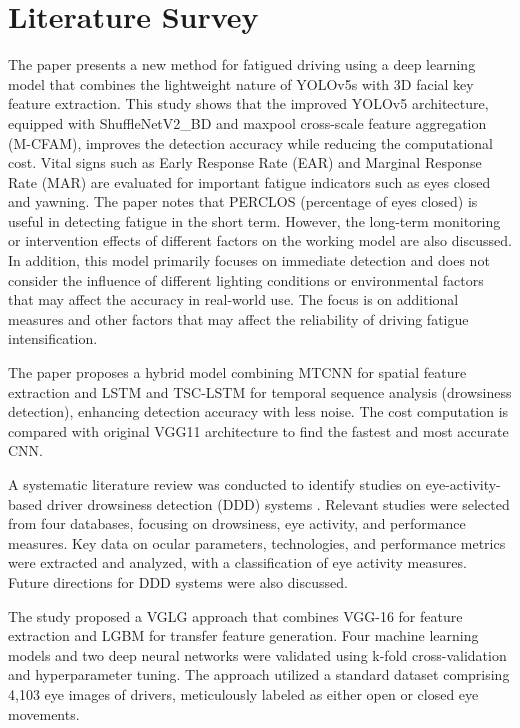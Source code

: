 \chapter{Literature Survey}

The paper \cite{ran2023} presents a new method for fatigued driving using a deep learning model that combines the lightweight nature of YOLOv5s with 3D facial key feature extraction. This study shows that the improved YOLOv5 architecture, equipped with ShuffleNetV2\_BD and maxpool cross-scale feature aggregation (M-CFAM), improves the detection accuracy while reducing the computational cost. Vital signs such as Early Response Rate (EAR) and Marginal Response Rate (MAR) are evaluated for important fatigue indicators such as eyes closed and yawning.
The paper notes that PERCLOS (percentage of eyes closed) is useful in detecting fatigue in the short term. However, the long-term monitoring or intervention effects of different factors on the working model are also discussed.
In addition, this model primarily focuses on immediate detection and does not consider the influence of different lighting conditions or environmental factors that may affect the accuracy in real-world use. The focus is on additional measures and other factors that may affect the reliability of driving fatigue intensification.

The paper \cite{guo2019} proposes a hybrid model combining MTCNN for spatial feature extraction and LSTM and TSC-LSTM for temporal sequence analysis (drowsiness detection), enhancing detection accuracy with less noise. The cost computation is compared with original VGG11 architecture to find the fastest and most accurate CNN.

A systematic literature review was conducted to identify studies on eye-activity-based driver drowsiness detection (DDD) systems \cite{kolus2024}. Relevant studies were selected from four databases, focusing on drowsiness, eye activity, and performance measures. Key data on ocular parameters, technologies, and performance metrics were extracted and analyzed, with a classification of eye activity measures. Future directions for DDD systems were also discussed.

The study \cite{madni2024} proposed a VGLG approach that combines VGG-16 for feature extraction and LGBM for transfer feature generation. Four machine learning models and two deep neural networks were validated using k-fold cross-validation and hyperparameter tuning. The approach utilized a standard dataset comprising 4,103 eye images of drivers, meticulously labeled as either open or closed eye movements.


